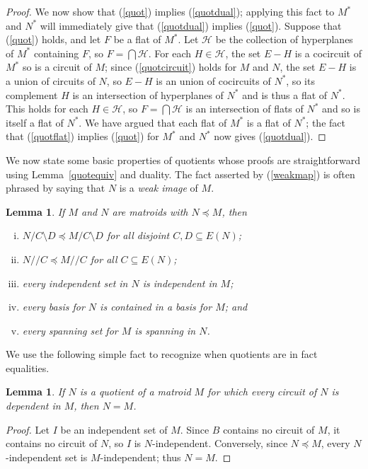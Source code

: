 \documentclass{amsart}
\theoremstyle{plain}
\newtheorem{lemma}[theorem]{Lemma}
\theoremstyle{definition}
\newcommand{\cH}{\mathcal{H}}
\newcommand{\dcon}{/ \!\! /}
\newcommand{\del}{\!\setminus\!}
\newcommand{\con}{/}
\renewcommand{\ss}{\subseteq}
\begin{document}
\begin{proof}
  We now show that (\ref{quot}) implies (\ref{quotdual}); applying this fact to 
  $M^*$ and $N^*$ will immediately give that (\ref{quotdual}) implies (\ref{quot}). 
  Suppose that (\ref{quot}) holds, and let $F$ be a flat of $M^*$. 
  Let $\cH$ be the collection of hyperplanes of $M^*$ containing $F$, so $F = \bigcap \cH$. 
  For each $H \in \cH$, the set $E - H$ is a cocircuit of $M^*$ so is a circuit of $M$; 
  since (\ref{quotcircuit}) holds for $M$ and $N$, the set $E - H$ is a union of circuits of $N$, 
  so $E - H$ is an union of cocircuits of $N^*$, so its complement $H$ 
  is an intersection of hyperplanes of $N^*$ and is thus a flat of $N^*$. 
  This holds for each $H \in \cH$, so $F = \bigcap \cH$ is an intersection of flats of $N^*$
  and so is itself a flat of $N^*$. We have argued that each flat of $M^*$ is a flat of $N^*$; 
  the fact that (\ref{quotflat}) implies (\ref{quot}) for $M^*$ and $N^*$ now gives (\ref{quotdual}).
\end{proof}

We now state some basic properties of quotients whose proofs are straightforward using 
Lemma~\ref{quotequiv} and duality. The fact asserted by (\ref{weakmap})
is often phrased by saying that $N$ is a \emph{weak image} of $M$. 

\begin{lemma}\label{minorquot}
  If $M$ and $N$ are matroids with $N \preceq M$, then 
  \begin{enumerate}[(i)]
    \item $N \con C \del D \preceq M \con C \del D$ for all disjoint $C,D \ss E(N)$;
    \item $N \dcon C \preceq M \dcon C$ for all $C \ss E(N)$;
    \item\label{weakmap} every independent set in $N$ is independent in $M$;
    \item every basis for $N$ is contained in a basis for $M$; and
    \item every spanning set for $M$ is spanning in $N$.
  \end{enumerate}
\end{lemma}

We use the following simple fact to recognize when quotients are in fact equalities.

\begin{lemma}\label{quotientext}
  If $N$ is a quotient of a matroid $M$ for which every circuit of $N$ is dependent in $M$, then $N = M$. 
\end{lemma}
\begin{proof}
  Let $I$ be an independent set of $M$. Since $B$ contains no circuit of $M$, it contains 
  no circuit of $N$, so $I$ is $N$-independent. 
  Conversely, since $N \preceq M$, every $N$-independent set is $M$-independent; thus $N = M$. 
\end{proof}
\end{document}
